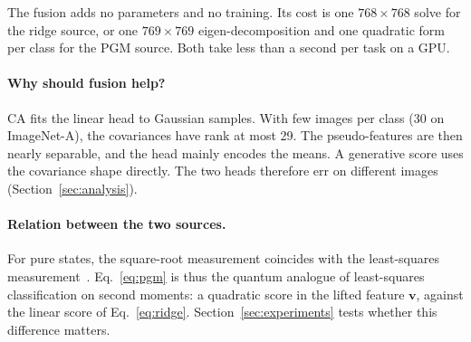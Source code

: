 The fusion adds no parameters and no training. Its cost is one $768\times768$
solve for the ridge source, or one $769\times769$ eigen-decomposition and one
quadratic form per class for the PGM source. Both take less than a second
per task on a GPU.

\paragraph{Why should fusion help?}
CA fits the linear head to Gaussian samples. With few images per class
(30 on ImageNet-A), the covariances have rank at most 29. The pseudo-features
are then nearly separable, and the head mainly encodes the means. A
generative score uses the covariance shape directly. The two heads therefore
err on different images (Section~\ref{sec:analysis}).

\paragraph{Relation between the two sources.}
For pure states, the square-root measurement coincides with the
least-squares measurement~\cite{eldar2001srm}. Eq.~\eqref{eq:pgm} is thus the
quantum analogue of least-squares classification on second moments: a
quadratic score in the lifted feature $\mathbf v$, against the linear score of
Eq.~\eqref{eq:ridge}. Section~\ref{sec:experiments} tests whether this
difference matters.
